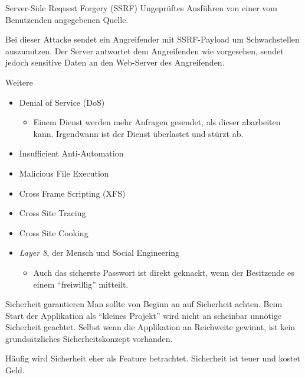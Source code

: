 \begin{defi}{Server-Side Request Forgery (SSRF)}
    Ungeprüftes Ausführen von einer vom Benutzenden angegebenen Quelle.

    Bei dieser Attacke sendet ein Angreifender mit SSRF-Payload um Schwachstellen auszunutzen.
    Der Server antwortet dem Angreifenden wie vorgesehen, sendet jedoch sensitive Daten an den Web-Server des Angreifenden.
\end{defi}

\begin{bonus}{Weitere}
    \begin{itemize}
        \item Denial of Service (DoS)
              \begin{itemize}
                  \item Einem Dienst werden mehr Anfragen gesendet, als dieser abarbeiten kann.
                        Irgendwann ist der Dienst überlastet und stürzt ab.
              \end{itemize}
        \item Insufficient Anti-Automation
        \item Malicious File Execution
        \item Cross Frame Scripting (XFS)
        \item Cross Site Tracing
        \item Cross Site Cooking
        \item \emph{Layer 8}, der Mensch und Social Engineering
              \begin{itemize}
                  \item Auch das sicherste Passwort ist direkt geknackt, wenn der Besitzende es einem \enquote{freiwillig} mitteilt.
              \end{itemize}
    \end{itemize}
\end{bonus}

\begin{bonus}{Sicherheit garantieren}
    Man sollte von Beginn an auf Sicherheit achten.
    Beim Start der Applikation als \enquote{kleines Projekt} wird nicht an scheinbar unnötige Sicherheit geachtet.
    Selbst wenn die Applikation an Reichweite gewinnt, ist kein grundsätzliches Sicherheitskonzept vorhanden.

    Häufig wird Sicherheit eher als Feature betrachtet.
    Sicherheit ist teuer und kostet Geld.
\end{bonus}